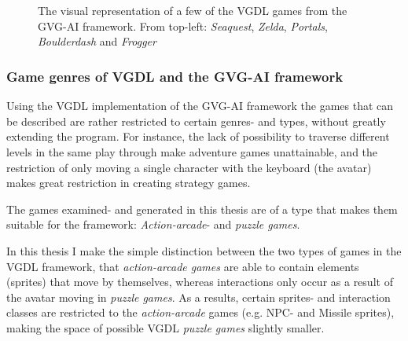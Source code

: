 \documentclass[a4paper,titlepage,final]{report}
\begin{document}
\begin{figure}[!ht]
{    	}\\
	\\
    	\caption{The visual representation of a few of the VGDL games from the GVG-AI framework. From top-left: \textit{Seaquest}, \emph{Zelda}, \emph{Portals}, \emph{Boulderdash} and \textit{Frogger}}
	\label{fig:gvgai_games_screenshots}
\end{figure}





\subsubsection*{Game genres of VGDL and the GVG-AI framework}
\label{ssec_gamegenres}
Using the VGDL implementation of the GVG-AI framework the games that can be described are rather restricted to certain genres- and types, without greatly extending the program.
For instance, the lack of possibility to traverse different levels in the same play through make adventure games unattainable, and the restriction of only moving a single character with the keyboard (the avatar) makes great restriction in creating strategy games.

The games examined- and generated in this thesis are of a type that makes them suitable for the framework: \textit{Action-arcade}- and \textit{puzzle games}. 

In this thesis I make the simple distinction between the two types of games in the VGDL framework, that \textit{action-arcade games} are able to contain elements (sprites) that move by themselves, whereas interactions only occur as a result of the avatar moving in \textit{puzzle games}.
As a results, certain sprites- and interaction classes are restricted to the \textit{action-arcade} games (e.g. NPC- and Missile sprites), making the space of possible VGDL \textit{puzzle games} slightly smaller.


\end{document}
